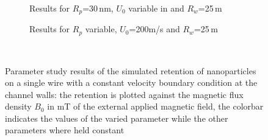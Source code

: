 \begin{figure}
\begin{subfigure}{0.49\textwidth}
                  \caption{Results for $R_{p}$=30\,nm, $U_{0}$ variable in and $R_{w}$=25\,\textmu m}\label{subfig:sw_constBC_U0_var}
          \end{subfigure}\hfill
        \begin{subfigure}{0.49\textwidth}
                \flushright
                \caption{Results for $R_{p}$ variable, $U_{0}$=200\textmu m/s and $R_{w}$=25\,\textmu m}\label{subfig:sw_constBC_Rp_var}
        \end{subfigure}
        \\
        
        \caption[Parameter study results of the simulated retention of nanoparticles on a single wire with a constant velocity boundary condition at the channel walls]{Parameter study results of the simulated retention of nanoparticles on a single wire with a constant velocity boundary condition at the channel walls: the retention is plotted against the magnetic flux density $B_{0}$ in mT of the external applied magnetic field, the colorbar indicates the values of the varied parameter while the other parameters where held constant}
        \label{fig:sw_param_res_constBC}
  \end{figure}
  
